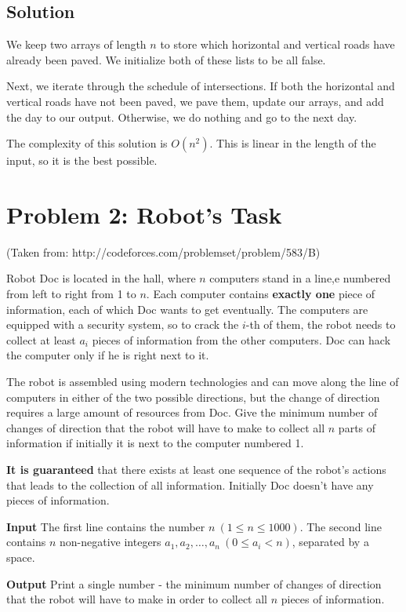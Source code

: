 \normalfont\documentclass[letterpaper,11pt]{article}
\begin{document}
\subsection*{Solution}
We keep two arrays of length $n$ to store which horizontal and vertical roads have already been paved. We initialize both of these lists to be all false.

Next, we iterate through the schedule of intersections. If both the horizontal and vertical roads have not been paved, we pave them, update our arrays, and add the day to our output. Otherwise, we do nothing and go to the next day.

The complexity of this solution is $O(n^2)$. This is linear in the length of the input, so it is the best possible. \newline

\section*{Problem 2: Robot's Task}
(Taken from: http://codeforces.com/problemset/problem/583/B)

Robot Doc is located in the hall, where $n$ computers stand in a line,e numbered from left to right from 1 to $n$. Each computer contains \textbf{exactly one} piece of information, each of which Doc wants to get eventually. The computers are equipped with a security system, so to crack the $i$-th of them, the robot needs to collect at least $a_i$ pieces of information from the other computers. Doc can hack the computer only if he is right next to it.

The robot is assembled using modern technologies and can move along the line of computers in either of the two possible directions, but the change of direction requires a large amount of resources from Doc. Give the minimum number of changes of direction that the robot will have to make to collect all $n$ parts of information if initially it is next to the computer numbered 1.

\textbf{It is guaranteed} that there exists at least one sequence of the robot's actions that leads to the collection of all information. Initially Doc doesn't have any pieces of information.

\textbf{Input} \newline
The first line contains the number $n \ (1 \leq n \leq 1000)$. The second line contains $n$ non-negative integers $a_1, a_2, \ldots, a_n \ (0 \leq a_i < n)$, separated by a space.

\textbf{Output} \newline
Print a single number - the minimum number of changes of direction that the robot will have to make in order to collect all $n$ pieces of information.
\end{document}
